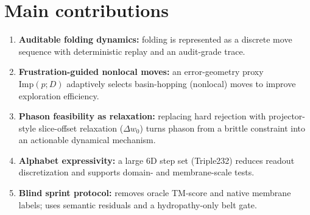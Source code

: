 \section*{Main contributions}
\begin{enumerate}[leftmargin=*]
  \item \textbf{Auditable folding dynamics:} folding is represented as a discrete move sequence with deterministic replay and an audit-grade trace.
  \item \textbf{Frustration-guided nonlocal moves:} an error-geometry proxy $\mathrm{Imp}(p;D)$ adaptively selects basin-hopping (nonlocal) moves to improve exploration efficiency.
  \item \textbf{Phason feasibility as relaxation:} replacing hard rejection with projector-style slice-offset relaxation ($\Delta w_0$) turns phason from a brittle constraint into an actionable dynamical mechanism.
  \item \textbf{Alphabet expressivity:} a large 6D step set (Triple232) reduces readout discretization and supports domain- and membrane-scale tests.
  \item \textbf{Blind sprint protocol:} removes oracle TM-score and native membrane labels; uses semantic residuals and a hydropathy-only belt gate.
\end{enumerate}
